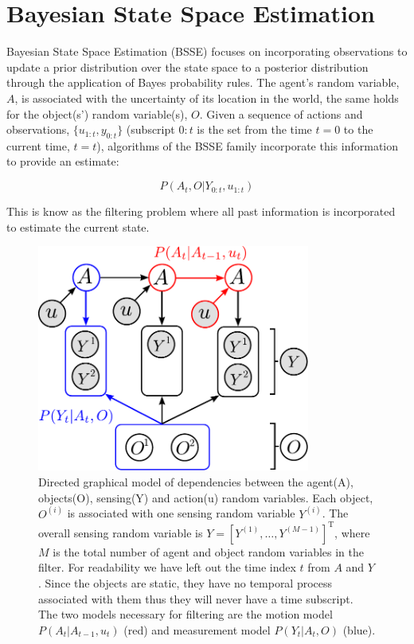 \section{Bayesian State Space Estimation}\label{ch5:BSSE}

Bayesian State Space Estimation (BSSE) focuses on incorporating observations to update a prior distribution over
the state space to a posterior distribution through the application of Bayes probability rules. The agent's random variable, $A$, 
is associated with the uncertainty of its location in the world, the same holds for the object(s') random variable(s), $O$. 
Given a sequence of actions and observations, $\{u_{1:t},y_{0:t}\}$ (subscript $0:t$ is the set from the time $t=0$ to the current time, $t=t$), 
algorithms of the BSSE family incorporate this information to provide an estimate:

\begin{equation}
 P(A_t,O|Y_{0:t},u_{1:t}) 
 \label{eq:joint}
\end{equation}

This is know as the filtering problem where all past information is incorporated to estimate the current state.  

\begin{figure}
\centering
\includegraphics[width=0.8\textwidth]{./ch5-MLMF/Figures/Figure2.pdf}
\caption{Directed graphical model of dependencies between the agent(A), objects(O), sensing(Y) and action(u) random variables. Each 
object, $O^{(i)}$ is associated with one sensing random variable $Y^{(i)}$. The overall sensing random variable is $Y = \left[Y^{(1)},\dots,Y^{(M-1)}\right]^{\mathrm{T}}$,
where $M$ is the total number of agent and object random variables in the filter. 
For readability we have left out the time index $t$ from $A$ and $Y$. Since the objects are static, they have no temporal process associated with 
them thus they will never have a time subscript. The two models necessary for filtering are the motion model $P(A_t|A_{t-1},u_t)$ (red) and measurement model
$P(Y_t|A_t,O)$ (blue).}
\label{fig:bayesian_sse_dag}
\end{figure}

